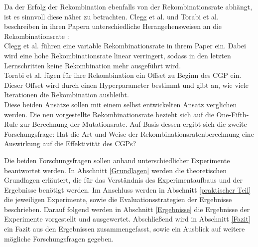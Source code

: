 Da der Erfolg der Rekombination ebenfalls von der Rekombinationsrate abhängt, ist es sinnvoll diese näher zu betrachten. 
Clegg et al. und Torabi et al. beschreiben in ihren Papern unterschiedliche Herangehensweisen an die Rekombinationsrate \cite{clegg_new_2007, torabi_using_2022}:\\
Clegg et al. führen eine variable Rekombinationsrate in ihrem Paper ein.
Dabei wird eine hohe Rekombinationsrate linear verringert, sodass in den letzten Lernschritten keine Rekombination mehr ausgeführt wird. \cite{clegg_new_2007}\\
Torabi et al. fügen für ihre Rekombination ein Offset zu Beginn des CGP ein. 
Dieser Offset wird durch einen Hyperparameter bestimmt und gibt an, wie viele Iterationen die Rekombination ausbleibt. \cite{torabi_using_2022}\\
Diese beiden Ansätze sollen mit einem selbst entwickelten Ansatz verglichen werden.
Die neu vorgestellte Rekombinationsrate bezieht sich auf die One-Fifth-Rule zur Berechnung der Mutationsrate.
Auf Basis dessen ergibt sich die zweite Forschungsfrage: \glqq Hat die Art und Weise der Rekombinationsratenberechnung eine Auswirkung auf die Effektivität des CGPs?\grqq

Die beiden Forschungsfragen sollen anhand unterschiedlicher Experimente beantwortet werden.
In Abschnitt \ref{Grundlagen} werden die theoretischen Grundlagen erläutert, die für das Verständnis des Experimentaufbaus und der Ergebnisse benötigt werden.
Im Anschluss werden in Abschnitt \ref{praktischer Teil} die jeweiligen Experimente, sowie die Evaluationsstrategien der Ergebnisse beschrieben.
Darauf folgend werden in Abschnitt \ref{Ergebnisse} die Ergebnisse der Experimente vorgestellt und ausgewertet.
Abschließend wird in Abschnitt \ref{Fazit} ein Fazit aus den Ergebnissen zusammengefasst, sowie ein Ausblick auf weitere mögliche Forschungsfragen gegeben.
